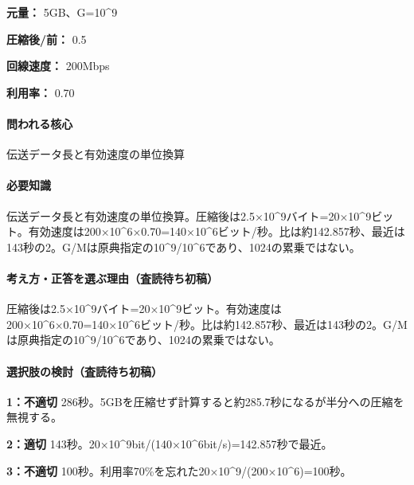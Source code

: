 \noindent\textbf{元量：} 5GB、G=\allowbreak{}10\textasciicircum{}9\par

\noindent\textbf{圧縮後/前：} 0.5\par

\noindent\textbf{回線速度：} 200Mbps\par

\noindent\textbf{利用率：} 0.70\par

\paragraph{問われる核心} 伝送データ長と有効速度の単位換算

\paragraph{必要知識} 伝送データ長と有効速度の単位換算。圧縮後は2.5×10\textasciicircum{}9バイト=20×10\textasciicircum{}9ビット。有効速度は200×10\textasciicircum{}6×0.70=\allowbreak{}140×10\textasciicircum{}6ビット/秒。比は約142.857秒、最近は143秒の2。G/Mは原典指定の10\textasciicircum{}9/10\textasciicircum{}6であり、1024の累乗ではない。

\paragraph{考え方・正答を選ぶ理由（査読待ち初稿）} 圧縮後は2.5×10\textasciicircum{}9バイト=20×10\textasciicircum{}9ビット。有効速度は200×10\textasciicircum{}6×0.70=\allowbreak{}140×10\textasciicircum{}6ビット/秒。比は約142.857秒、最近は143秒の2。G/Mは原典指定の10\textasciicircum{}9/10\textasciicircum{}6であり、1024の累乗ではない。

\paragraph{選択肢の検討（査読待ち初稿）}\mbox{}\par

\noindent\textbf{1：不適切} 286秒。5GBを圧縮せず計算すると約285.7秒になるが半分への圧縮を無視する。\par

\noindent\textbf{2：適切} 143秒。20×10\textasciicircum{}9bit/(140×10\textasciicircum{}6bit/s)=\allowbreak{}142.857秒で最近。\par

\noindent\textbf{3：不適切} 100秒。利用率70\%を忘れた20×10\textasciicircum{}9/(200×10\textasciicircum{}6)=\allowbreak{}100秒。\par

